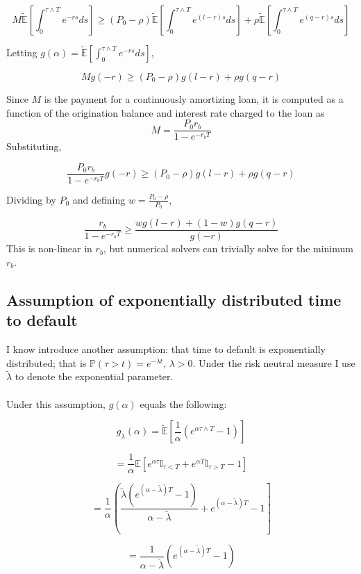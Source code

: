 \documentclass{article}
\begin{document}
\[
M\mathbb{\tilde{E}}\left[ \int_0 ^ {\tau \wedge T} e^{-rs} ds \right]  \geq 
\left(P_0-\rho \right)\mathbb{\tilde{E}}\left[ \int_0 ^ {\tau \wedge T} e^{(l-r)s}  ds \right]
+\rho\mathbb{\tilde{E}}\left[ \int_0 ^ {\tau \wedge T} e^{(q-r)s} ds \right]
\]

Letting \(g(\alpha)=\mathbb{\tilde{E}}\left[ \int_0 ^ {\tau \wedge T} e^{-rs} ds \right]\), 

\[
M g(-r) \geq 
\left(P_0-\rho \right)g(l-r)
+\rho g(q-r)
\]

Since \(M\) is the payment for a continuously amortizing loan, it is computed as a function of the origination balance and interest rate charged to the loan as 
\[M=\frac{P_0 r_b}{1-e^{-r_b T}}\]
Substituting,

\[
\frac{P_0 r_b}{1-e^{-r_b T}} g(-r) \geq 
\left(P_0-\rho \right)g(l-r)
+\rho g(q-r)
\]

Dividing by \(P_0\) and defining \(w=\frac{P_0-\rho}{P_0}\),

\begin{equation} \label{simple}
\frac{ r_b}{1-e^{-r_b T}}  \geq 
\frac{wg(l-r)
+(1-w) g(q-r)}{g(-r)}
\end{equation}
This is non-linear in \(r_b\), but numerical solvers can trivially solve for the minimum \(r_b\).

\subsection{Assumption of exponentially distributed time to default}

I know introduce another assumption: that time to default is exponentially distributed; that is \(\mathbb{P}(\tau>t)=e^{-\lambda t},\,\lambda>0\).  Under the risk neutral measure I use \(\tilde{\lambda}\) to denote the exponential parameter.  
\\
\\
Under this assumption, \(g(\alpha)\) equals the following:


\[g_\lambda(\alpha)=\mathbb{\tilde{E}}\left[\frac{1}{\alpha} \left(e^{\alpha\tau \wedge T} -1 \right)  \right]\]

\[=\frac{1}{\alpha} \mathbb{E}\left[e^{\alpha \tau} \mathbb{I}_{\tau<T} +e^{\alpha T}\mathbb{I}_{\tau>T} -1\right]\]

\[=\frac{1}{\alpha} \left(\frac{\tilde{\lambda} \left(e^{(\alpha-\tilde{\lambda})T} -1\right) }{\alpha-\tilde{\lambda}}+e^{(\alpha-\tilde{\lambda})T} -1 \right] \]

\[=\frac{1}{\alpha - \tilde{\lambda}}\left(e^{(\alpha-\tilde{\lambda})T}-1\right)\]
\end{document}
